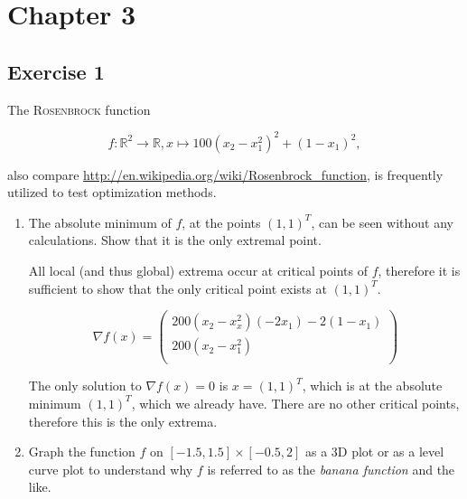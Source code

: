 \documentclass[11pt,oneside]{extarticle}
\newcommand{\Real}{\mathbb{R}}
\begin{document}
\section{Chapter 3}

\subsection{Exercise 1}

The \textsc{Rosenbrock} function

$$
f:\Real^2 \rightarrow \Real, x \mapsto 100(x_2-x_1^2)^2 + (1-x_1)^2,
$$

also compare \url{http://en.wikipedia.org/wiki/Rosenbrock_function}, is frequently
utilized to test optimization methods.

\begin{enumerate}

    \item The absolute minimum of $f$, at the points $(1,1)^T$, can be seen 
        without any calculations. Show that it is the only extremal point.

    All local (and thus global) extrema occur at critical points of $f$, therefore
    it is sufficient to show that the only critical point exists at $(1,1)^T$.

    $$\nabla f(x)=\begin{pmatrix}
        200(x_2 - x_x^2 ) (-2x_1) - 2(1-x_1) \\
        200(x_2-x_1^2) \\
    \end{pmatrix}$$

    The only solution to $\nabla f(x) = 0$ is $x=(1,1)^T$, which is at the
    absolute minimum $(1,1)^T$, which we already have. There are no other critical
    points, therefore this is the only extrema.

    \item Graph the function $f$ on $[-1.5,1.5]\times [-0.5,2]$ as a 3D plot or
        as a level curve plot to understand why $f$ is referred to as the
        \emph{banana function} and the like.


\end{enumerate}
\end{document}
